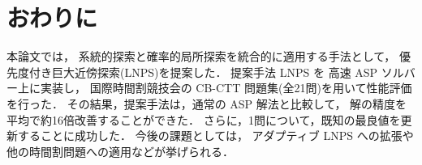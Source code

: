 \section{おわりに}

本論文では，
系統的探索と確率的局所探索を統合的に適用する手法として，
優先度付き巨大近傍探索(LNPS)を提案した．
提案手法 LNPS を 高速 ASP ソルバー{\clingo}上に実装し，
国際時間割競技会の CB-CTT 問題集(全21問)を用いて性能評価を行った．
その結果，提案手法は，通常の ASP 解法と比較して，
解の精度を平均で約16倍改善することができた．
さらに，1問について，既知の最良値を更新することに成功した．
今後の課題としては，
アダプティブ LNPS への拡張や他の時間割問題への適用などが挙げられる．


